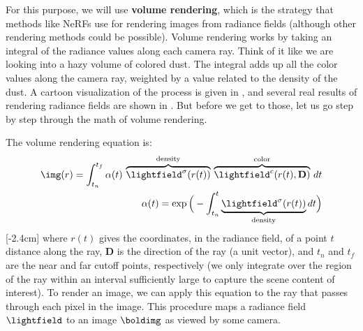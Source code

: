 For this purpose, we will use \textbf{volume rendering}, which is the strategy that methods like NeRFs use for
rendering images from radiance fields (although other rendering methods could be possible). Volume rendering works by taking an integral
of the radiance values along each camera ray. Think of it like we are looking into a hazy volume of colored dust. The integral adds up all the
color values along the camera ray, weighted by a value related to the density of the dust. A cartoon visualization of the process is given in \fig{\ref{fig:nerfs:flatland_volume_rendering}}, and several real results of rendering radiance fields are shown in \fig{\ref{fig:nerfs:flatland_training}}. But before we get to those, let us go step by step through the math of volume rendering.

The volume rendering equation is:
\begin{align}
    \img(r) = \int_{t_n}^{t_f}\alpha(t) \, \overbrace{\lightfield^\sigma(r(t))}^{\text{density}} \, \overbrace{\lightfield^c(r(t),\mathbf{D})}^{\text{color}} \, dt \label{eqn:nerfs:vol_rendering_integral} \\
    \alpha(t) = \exp \Big(-\int_{t_n}^{t} \underbrace{\lightfield^\sigma(r(t))}_{\text{density}} dt\Big)
\end{align}
[-2.4cm]
where $r(t)$ gives the coordinates, in the radiance field, of a point $t$ distance along the ray, $\mathbf{D}$ is the direction of the ray (a unit vector), and $t_n$ and $t_f$ are the near and far cutoff points, respectively (we only integrate over the region of the ray within an interval sufficiently large to capture the scene content of interest). To render an image, we can apply this equation to the ray that passes through each pixel in the image. This procedure maps a radiance field $\lightfield$ to an image $\boldimg$ as viewed by some camera.

